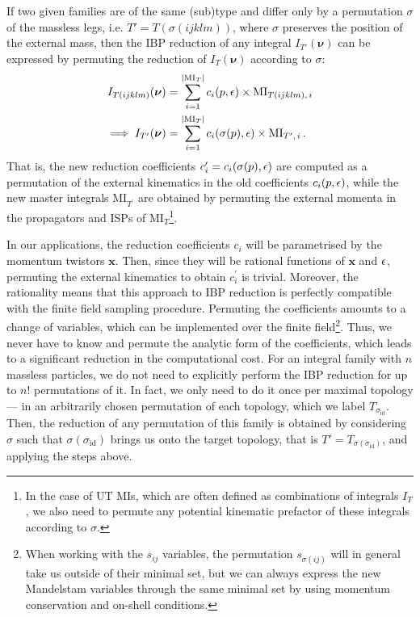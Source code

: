 \documentclass[main.tex]{subfiles}
\begin{document}
If two given families are of the same (sub)type and differ only by a permutation $\sigma$ of the massless legs, i.e. $T'=T(\sigma(ijklm))$, where $\sigma$ preserves the position of the external mass, then the IBP reduction of any integral $I_{T'}(\bm{\nu})$ can be expressed by permuting the reduction of $I_T(\bm{\nu})$ according to $\sigma$:
\begin{align}
    I_{T(ijklm)}(\bm{\nu}) &= \sum_{i=1}^{|\text{MI}_T|} c_i(p, \epsilon) \times \text{MI}_{T(ijklm),\,i} \\
    \implies I_{T'}(\bm{\nu}) &= \sum_{i=1}^{|\text{MI}_T|} c_i(\sigma(p), \epsilon) \times \text{MI}_{T^\prime,\,i}\,.
\end{align}
That is, the new reduction coefficients $c^\prime_i = c_i(\sigma(p), \epsilon)$ are computed as a permutation of the external kinematics in the old coefficients $c_i(p, \epsilon)$, while the new master integrals MI$_{T^\prime}$ are obtained by permuting the external momenta in the propagators and ISPs of MI$_T$\footnote{In the case of UT MIs, which are often defined as combinations of integrals $I_T$, we also need to permute any potential kinematic prefactor of these integrals according to $\sigma$.}.

In our applications, the reduction coefficients $c_i$ will be parametrised by the momentum twistors $\mathbf{x}$. Then, since they will be rational functions of $\mathbf{x}$ and $\epsilon$, permuting the external kinematics to obtain $c_i^\prime$ is trivial. Moreover, the rationality means that this approach to IBP reduction is perfectly compatible with the finite field sampling procedure. Permuting the coefficients amounts to a change of variables, which can be implemented over the finite field\footnote{When working with the $s_{ij}$ variables, the permutation $s_{\sigma(ij)}$ will in general take us outside of their minimal set, but we can always express the new Mandelstam variables through the same minimal set by using momentum conservation and on-shell conditions.}. Thus, we never have to know and permute the analytic form of the coefficients, which leads to a significant reduction in the computational cost. For an integral family with $n$ massless particles, we do not need to explicitly perform the IBP reduction for up to $n!$ permutations of it. In fact, we only need to do it once per maximal topology --- in an arbitrarily chosen permutation of each topology, which we label $T_{\sigma_\text{id}}$. Then, the reduction of any permutation of this family is obtained by considering $\sigma$ such that $\sigma(\sigma_\text{id})$ brings us onto the target topology, that is $T' = T_{\sigma(\sigma_\text{id})}$, and applying the steps above.
\end{document}
